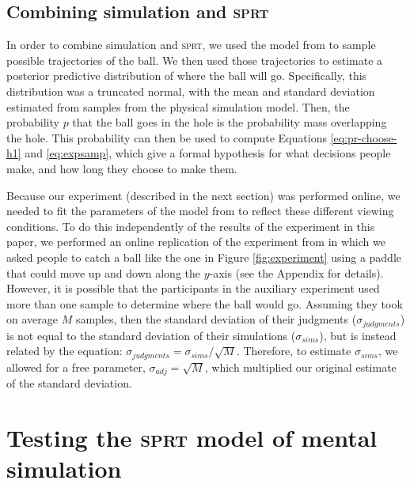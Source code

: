 \documentclass[10pt,letterpaper]{article}
\begin{document}
\subsection{Combining simulation and \textsc{sprt}}

In order to combine simulation and \textsc{sprt}, we used the model from  to sample possible trajectories of the ball.
We then used those trajectories to estimate a posterior predictive distribution of where the ball will go.
Specifically, this distribution was a truncated normal, with the mean and standard deviation estimated from samples from the physical simulation model.
Then, the probability $p$ that the ball goes in the hole is the probability mass overlapping the hole.
This probability can then be used to compute Equations \ref{eq:pr-choose-h1} and \ref{eq:expsamp}, which give a formal hypothesis for what decisions people make, and how long they choose to make them.

Because our experiment (described in the next section) was performed online, we needed to fit the parameters of the model from  to reflect these different viewing conditions.
To do this independently of the results of the experiment in this paper, we performed an online replication of the experiment from  in which we asked people to catch a ball like the one in Figure \ref{fig:experiment} using a paddle that could move up and down along the $y$-axis (see the Appendix for details).
However, it is possible that the participants in the auxiliary experiment used more than one sample to determine where the ball would go.
Assuming they took on average $M$ samples, then the standard deviation of their judgments ($\sigma_{judgments}$) is not equal to the standard deviation of their simulations ($\sigma_{sims}$), but is instead related by the equation: $\sigma_{judgments} = \sigma_{sims} / \sqrt{M}$.
Therefore, to estimate $\sigma_{sims}$, we allowed for a free parameter, $\sigma_{adj}=\sqrt{M}$, which multiplied our original estimate of the standard deviation.

\section{Testing the \textsc{sprt} model of mental simulation}
\end{document}
